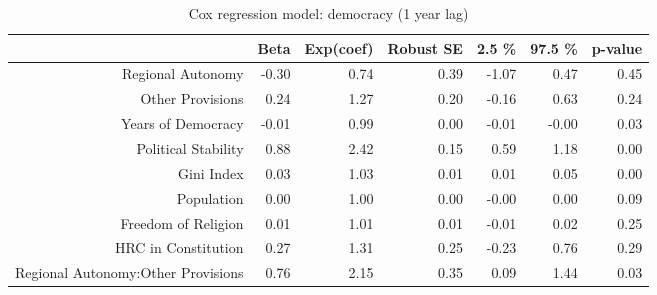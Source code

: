 \begin{table}[ht]
\centering
\begin{tabular}{rrrrrrr}
  \hline
 & Beta & Exp(coef) & Robust SE & 2.5 \% & 97.5 \% & p-value \\ 
  \hline
Regional Autonomy & -0.30 & 0.74 & 0.39 & -1.07 & 0.47 & 0.45 \\ 
  Other Provisions & 0.24 & 1.27 & 0.20 & -0.16 & 0.63 & 0.24 \\ 
  Years of Democracy & -0.01 & 0.99 & 0.00 & -0.01 & -0.00 & 0.03 \\ 
  Political Stability & 0.88 & 2.42 & 0.15 & 0.59 & 1.18 & 0.00 \\ 
  Gini Index & 0.03 & 1.03 & 0.01 & 0.01 & 0.05 & 0.00 \\ 
  Population & 0.00 & 1.00 & 0.00 & -0.00 & 0.00 & 0.09 \\ 
  Freedom of Religion & 0.01 & 1.01 & 0.01 & -0.01 & 0.02 & 0.25 \\ 
  HRC in Constitution & 0.27 & 1.31 & 0.25 & -0.23 & 0.76 & 0.29 \\ 
  Regional Autonomy:Other Provisions & 0.76 & 2.15 & 0.35 & 0.09 & 1.44 & 0.03 \\ 
   \hline
\end{tabular}
\caption{Cox regression model: democracy (1 year lag)} 
\end{table}
